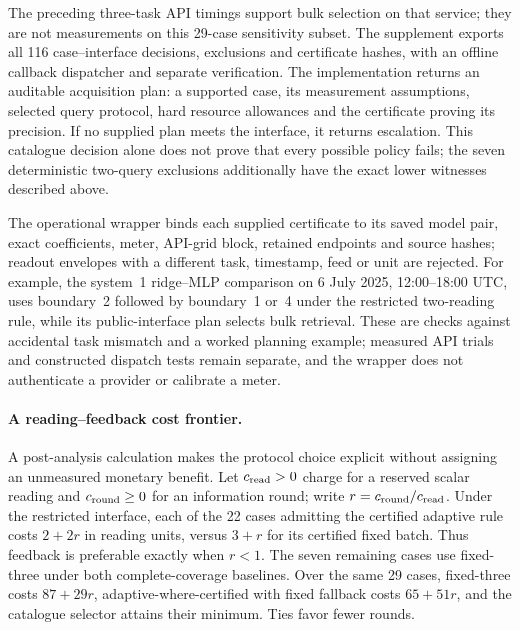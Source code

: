 The preceding three-task API timings support bulk selection on that service;
they are not measurements on this 29-case sensitivity subset. The supplement exports all
116 case--interface decisions, exclusions and certificate hashes, with an
offline callback dispatcher and separate verification. The implementation returns an auditable acquisition plan: a supported
case, its measurement assumptions, selected query protocol, hard resource
allowances and the certificate proving its precision. If no supplied plan
meets the interface, it returns escalation. This catalogue decision alone
does not prove that every possible policy fails; the seven deterministic
two-query exclusions additionally have the exact lower witnesses described
above.

The operational wrapper binds each supplied certificate to its saved model
pair, exact coefficients, meter, API-grid block, retained endpoints and source
hashes; readout envelopes with a different task, timestamp, feed or unit are
rejected. For example, the system~1 ridge--MLP comparison on 6 July 2025,
12:00--18:00 UTC, uses boundary~2 followed by boundary~1 or~4 under the
restricted two-reading rule, while its public-interface plan selects bulk
retrieval. These are checks against accidental task mismatch and a worked
planning example; measured API trials and constructed dispatch tests remain
separate, and the wrapper does not authenticate a provider or calibrate a meter.
\paragraph{A reading--feedback cost frontier.}
A post-analysis calculation makes the protocol choice explicit without
assigning an unmeasured monetary benefit. Let $c_{\rm read}>0$ charge for a
reserved scalar reading and $c_{\rm round}\geq0$ for an information round;
write $r=c_{\rm round}/c_{\rm read}$. Under the restricted interface, each of
the 22 cases admitting the certified adaptive rule costs $2+2r$ in reading
units, versus $3+r$ for its certified fixed batch. Thus feedback is preferable
exactly when $r<1$. The seven remaining cases use fixed-three under both
complete-coverage baselines. Over the same 29 cases, fixed-three costs
$87+29r$, adaptive-where-certified with fixed fallback costs $65+51r$, and
the catalogue selector attains their minimum. Ties favor fewer rounds.

